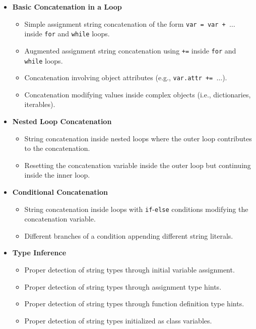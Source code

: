 \documentclass[12pt, titlepage]{article}
\begin{document}
\begin{itemize}
  \item \textbf{Basic Concatenation in a Loop}
  \begin{itemize}
      \item Simple assignment string concatenation of the form \texttt{var = var + \( \ldots \)} inside \texttt{for} and \texttt{while} loops.
      \item Augmented assignment string concatenation using \texttt{+=} inside \texttt{for} and \texttt{while} loops.
      \item Concatenation involving object attributes (e.g., \texttt{var.attr += \( \ldots \)}).
      \item Concatenation modifying values inside complex objects (i.e., dictionaries, iterables).
  \end{itemize}
  
  \item \textbf{Nested Loop Concatenation}
  \begin{itemize}
      \item String concatenation inside nested loops where the outer loop contributes to the concatenation.
      \item Resetting the concatenation variable inside the outer loop but continuing inside the inner loop.
  \end{itemize}

  \item \textbf{Conditional Concatenation}
  \begin{itemize}
      \item String concatenation inside loops with \texttt{if}-\texttt{else} conditions modifying the concatenation variable.
      \item Different branches of a condition appending different string literals.
  \end{itemize}

  \item \textbf{Type Inference}
  \begin{itemize}
      \item Proper detection of string types through initial variable assignment.
      \item Proper detection of string types through assignment type hints.
      \item Proper detection of string types through function definition type hints.
      \item Proper detection of string types initialized as class variables.
  \end{itemize}


\end{itemize}
\end{document}
